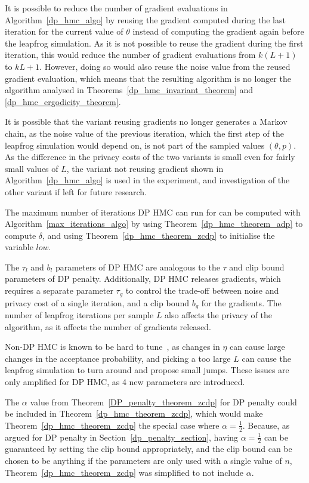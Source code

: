 \documentclass[english,twoside,openright]{HYgraduMLDS}
\begin{document}
It is possible to reduce the number of gradient evaluations in
Algorithm~\ref{dp_hmc_algo} by reusing the gradient computed during the last
iteration for the current value of \(\theta\) instead of computing the gradient
again before the leapfrog simulation. As it is not possible to reuse the gradient
during the first iteration, this would reduce the number of gradient evaluations
from \(k(L + 1)\) to \(kL + 1\). However, doing so would
also reuse the noise value from the reused gradient evaluation, which means that
the resulting algorithm is no longer the algorithm analysed in
Theorems~\ref{dp_hmc_invariant_theorem} and \ref{dp_hmc_ergodicity_theorem}.

It is possible that the variant reusing gradients no longer
generates a Markov chain, as the noise value of the previous iteration, which
the first step of the leapfrog simulation would depend on, is not
part of the sampled values \((\theta, p)\). As the difference in the privacy
costs of the two variants is small even for fairly small values of \(L\),
the variant not reusing gradient shown in Algorithm~\ref{dp_hmc_algo}
is used in the experiment, and investigation of the other variant if left
for future research.

The maximum number of iterations DP HMC can run for can be computed with
Algorithm~\ref{max_iterations_algo} by using Theorem~\ref{dp_hmc_theorem_adp}
to compute \(\delta\), and using Theorem~\ref{dp_hmc_theorem_zcdp}
to initialise the variable \(low\).

The \(\tau_{l}\) and \(b_{l}\) parameters of DP HMC are analogous to the
\(\tau\) and clip bound parameters of DP penalty. Additionally, DP HMC
releases gradients, which requires a separate parameter \(\tau_{g}\) to
control the trade-off between noise and privacy cost of a single iteration,
and a clip bound \(b_{g}\) for the gradients. The number of leapfrog iterations
per sample \(L\) also affects the privacy of the algorithm, as it affects the
number of gradients released.

Non-DP HMC is known to be hard to tune~\cite{neal2012mcmc},
as changes in \(\eta\) can cause large changes in the acceptance probability,
and picking a too large \(L\) can cause the leapfrog simulation to turn
around and propose small jumps. These issues are only amplified for DP HMC,
as 4 new parameters are introduced.

The \(\alpha\) value from Theorem~\ref{DP_penalty_theorem_zcdp} for
DP penalty could be included in Theorem~\ref{dp_hmc_theorem_zcdp},
which would make Theorem~\ref{dp_hmc_theorem_zcdp} the special case where
\(\alpha = \frac{1}{2}\). Because, as argued for DP penalty in
Section~\ref{dp_penalty_section}, having \(\alpha = \frac{1}{2}\) can be
guaranteed by setting the clip bound appropriately, and the clip bound can
be chosen to be anything if the parameters are only used with a single value
of \(n\),
Theorem~\ref{dp_hmc_theorem_zcdp} was simplified to not include \(\alpha\).
\end{document}
